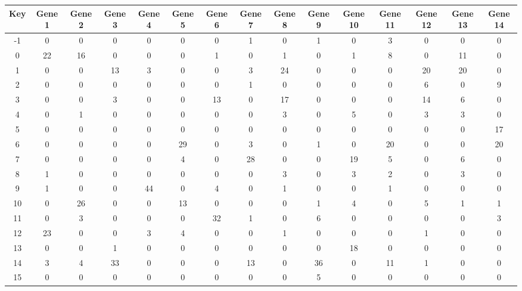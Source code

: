 \begin{tabular}{|c|c|c|c|c|c|c|c|c|c|c|c|c|c|c|}
\hline
Key & Gene 1 & Gene 2 & Gene 3 & Gene 4 & Gene 5 & Gene 6 & Gene 7 & Gene 8 & Gene 9 & Gene 10 & Gene 11 & Gene 12 & Gene 13 & Gene 14 \\
\hline
-1 & 0 & 0 & 0 & 0 & 0 & 0 & 1 & 0 & 1 & 0 & 3 & 0 & 0 & 0 \\
0 & 22 & 16 & 0 & 0 & 0 & 1 & 0 & 1 & 0 & 1 & 8 & 0 & 11 & 0 \\
1 & 0 & 0 & 13 & 3 & 0 & 0 & 3 & 24 & 0 & 0 & 0 & 20 & 20 & 0 \\
2 & 0 & 0 & 0 & 0 & 0 & 0 & 1 & 0 & 0 & 0 & 0 & 6 & 0 & 9 \\
3 & 0 & 0 & 3 & 0 & 0 & 13 & 0 & 17 & 0 & 0 & 0 & 14 & 6 & 0 \\
4 & 0 & 1 & 0 & 0 & 0 & 0 & 0 & 3 & 0 & 5 & 0 & 3 & 3 & 0 \\
5 & 0 & 0 & 0 & 0 & 0 & 0 & 0 & 0 & 0 & 0 & 0 & 0 & 0 & 17 \\
6 & 0 & 0 & 0 & 0 & 29 & 0 & 3 & 0 & 1 & 0 & 20 & 0 & 0 & 20 \\
7 & 0 & 0 & 0 & 0 & 4 & 0 & 28 & 0 & 0 & 19 & 5 & 0 & 6 & 0 \\
8 & 1 & 0 & 0 & 0 & 0 & 0 & 0 & 3 & 0 & 3 & 2 & 0 & 3 & 0 \\
9 & 1 & 0 & 0 & 44 & 0 & 4 & 0 & 1 & 0 & 0 & 1 & 0 & 0 & 0 \\
10 & 0 & 26 & 0 & 0 & 13 & 0 & 0 & 0 & 1 & 4 & 0 & 5 & 1 & 1 \\
11 & 0 & 3 & 0 & 0 & 0 & 32 & 1 & 0 & 6 & 0 & 0 & 0 & 0 & 3 \\
12 & 23 & 0 & 0 & 3 & 4 & 0 & 0 & 1 & 0 & 0 & 0 & 1 & 0 & 0 \\
13 & 0 & 0 & 1 & 0 & 0 & 0 & 0 & 0 & 0 & 18 & 0 & 0 & 0 & 0 \\
14 & 3 & 4 & 33 & 0 & 0 & 0 & 13 & 0 & 36 & 0 & 11 & 1 & 0 & 0 \\
15 & 0 & 0 & 0 & 0 & 0 & 0 & 0 & 0 & 5 & 0 & 0 & 0 & 0 & 0 \\
\hline
\end{tabular}